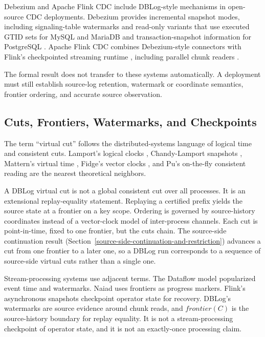 \documentclass[letterpaper,10pt,twocolumn]{article}
\newcommand{\Frontier}{\mathit{frontier}}
\begin{document}
Debezium \citep{debezium_incremental_snapshot} and Apache Flink
CDC \citep{flink_cdc_incremental_snapshot} include DBLog-style
mechanisms in open-source CDC deployments. Debezium provides
incremental snapshot modes, including signaling-table watermarks and
read-only variants that use executed GTID sets for MySQL and MariaDB
and transaction-snapshot information for PostgreSQL
\citep{debezium_read_only_snapshots}.
Apache Flink CDC combines Debezium-style connectors with Flink's
checkpointed streaming runtime \citep{carbone2015asynchronous},
including parallel chunk readers \citep{flink_cdc_incremental_snapshot}.

The formal result does not transfer to these systems automatically. A
deployment must still establish source-log retention, watermark or
coordinate semantics, frontier ordering, and accurate source
observation.

\subsection{Cuts, Frontiers, Watermarks, and
Checkpoints}\label{cuts-frontiers-watermarks-and-checkpoints}

The term ``virtual cut'' follows the distributed-systems language of
logical time and consistent cuts. Lamport's logical clocks
\citep{lamport1978time}, Chandy-Lamport snapshots
\citep{chandy1985snapshots}, Mattern's virtual time
\citep{mattern1989virtual}, Fidge's vector clocks
\citep{fidge1988vector}, and Pu's on-the-fly consistent reading
\citep{pu1986consistentreading} are the nearest theoretical neighbors.

A DBLog virtual cut is not a global consistent cut over all processes.
It is an extensional replay-equality statement. Replaying a certified
prefix yields the source state at a frontier on a key scope.
Ordering is governed by source-history coordinates instead of a
vector-clock model of inter-process channels. Each cut is point-in-time,
fixed to one frontier, but the cuts chain. The source-side continuation
result (Section~\ref{source-side-continuation-and-restriction}) advances
a cut from one frontier to a later one, so a DBLog run corresponds to a
sequence of source-side virtual cuts rather than a single one.

Stream-processing systems use adjacent terms. The Dataflow model
\citep{akidau2015dataflow} popularized event time and watermarks. Naiad
\citep{murray2013naiad} uses frontiers as progress markers. Flink's
asynchronous snapshots \citep{carbone2015asynchronous} checkpoint
operator state for recovery. DBLog's watermarks are source evidence
around chunk reads, and $\Frontier(C)$ is the source-history
boundary for replay equality. It is not a stream-processing checkpoint
of operator state, and it is not an exactly-once processing claim.
\end{document}
